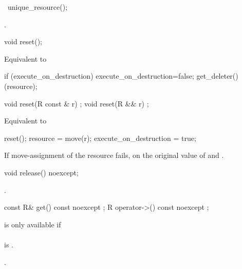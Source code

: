 \documentclass[ebook,11pt,article]{memoir}
\begin{document}
\begin{itemdecl}
~unique_resource();
\end{itemdecl}

\pnum
\effects {}.

\begin{itemdecl}
void reset();
\end{itemdecl}

\pnum
\effects Equivalent to
\begin{codeblock}
  if (execute_on_destruction) {
    execute_on_destruction=false;
    get_deleter()(resource);
  }
\end{codeblock}

\begin{itemdecl}
void reset(R const & r) ;
void reset(R && r) ;
\end{itemdecl}

\pnum
\effects Equivalent to
\begin{codeblock}
  reset();
  resource = move(r);
  execute_on_destruction = true;
\end{codeblock}
If move-assignment of the resource fails,  on the original value of  and .


\begin{itemdecl}
void release() noexcept;
\end{itemdecl}

\pnum
\effects {}.


\begin{itemdecl}
const R& get() const noexcept ;
R operator->() const noexcept ;
\end{itemdecl}

\pnum
\requires 
{} is only available if \\
\\ is . 

\pnum
\returns {}.
\end{document}

